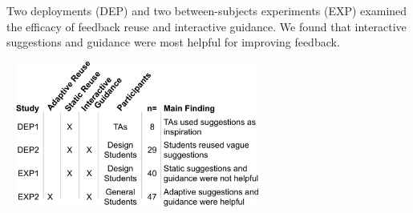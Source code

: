 \begin{table}[t]
\centering
  \caption{Two deployments (DEP) and two between-subjects experiments (EXP) examined the efficacy of feedback reuse and interactive guidance. We found that interactive suggestions and guidance were most helpful for improving feedback.}~\label{table:critiquekit_all_results}
  \includegraphics[width=0.6\textwidth]{critiquekit/figures/table1.png}
\end{table}


